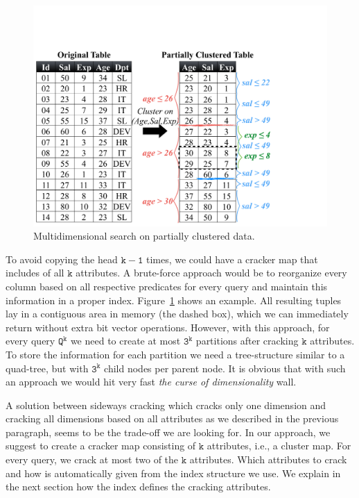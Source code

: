 \begin{figure}[t]
\begin{center}
\vspace*{3\baselineskip}
\includegraphics[trim=0cm 2cm 0cm 8.5cm, width=\columnwidth]{Figures/mcrack_relation_full}
\caption{Multidimensional search on partially clustered data.}
\label{fig:mcluster_full}
\end{center}
\end{figure}

To avoid copying the head $\mathtt{k-1}$ times, we could have a cracker map that includes of all $\mathtt{k}$ attributes.
A brute-force approach would be to reorganize every column based on all respective predicates for every query and maintain this information in a proper index.
Figure~\ref{fig:mcluster_full} shows an example.
All resulting tuples lay in a contiguous area in memory (the dashed box), which we can immediately return without extra bit vector operations.
However, with this approach, for every query $\mathtt{Q^k}$ we need to create at most $\mathtt{3^k}$ partitions after cracking $\mathtt{k}$ attributes.
To store the information for each partition we need a tree-structure similar to a quad-tree, but with $\mathtt{3^k}$ child nodes per parent node.
It is obvious that with such an approach we would hit very fast \emph{the curse of dimensionality} wall.

A solution between sideways cracking which cracks only one dimension and cracking all dimensions based on all attributes as we described in the previous paragraph, seems to be the trade-off we are looking for.
In our approach, we suggest to create a cracker map consisting of $\mathtt{k}$ attributes, i.e., a cluster map.
For every query, we crack at most two of the $\mathtt{k}$ attributes.
Which attributes to crack and how is automatically given from the index structure we use.
We explain in the next section how the index defines the cracking attributes.

